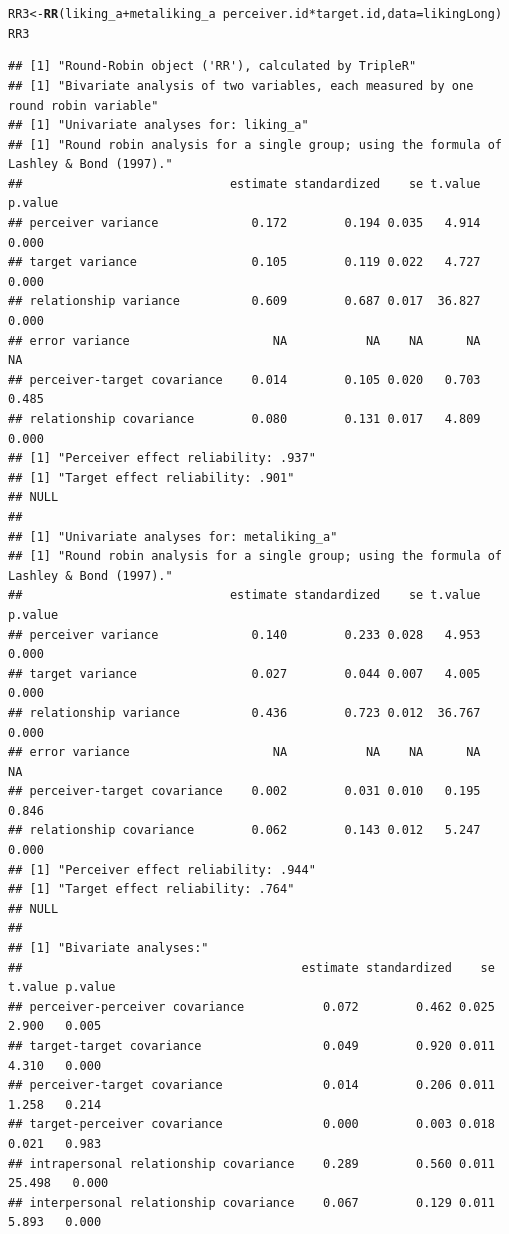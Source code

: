 \documentclass[a4paper]{article}\usepackage[]{graphicx}\usepackage[]{color}
\makeatletter
\newcommand{\hlopt}[1]{\textcolor[rgb]{0,0,0}{#1}}%
\newcommand{\hlstd}[1]{\textcolor[rgb]{0.345,0.345,0.345}{#1}}%
\newcommand{\hlkwb}[1]{\textcolor[rgb]{0.69,0.353,0.396}{#1}}%
\newcommand{\hlkwc}[1]{\textcolor[rgb]{0.333,0.667,0.333}{#1}}%
\newcommand{\hlkwd}[1]{\textcolor[rgb]{0.737,0.353,0.396}{\textbf{#1}}}%
\newenvironment{kframe}{%
 \def\at@end@of@kframe{}%
 \ifinner\ifhmode%
  \def\at@end@of@kframe{\end{minipage}}%
  \begin{minipage}{\columnwidth}%
 \fi\fi%
 \def\FrameCommand##1{\hskip\@totalleftmargin \hskip-\fboxsep
 \colorbox{shadecolor}{##1}\hskip-\fboxsep
     \hskip-\linewidth \hskip-\@totalleftmargin \hskip\columnwidth}%
 \MakeFramed {\advance\hsize-\width
   \@totalleftmargin\z@ \linewidth\hsize
   \@setminipage}}%
 {\par\unskip\endMakeFramed%
 \at@end@of@kframe}
\newenvironment{knitrout}{}{} %
\makeatother
\begin{document}
\begin{knitrout}\small
{}\color{fgcolor}\begin{kframe}
\begin{alltt}
\hlstd{RR3} \hlkwb{<-} \hlkwd{RR}\hlstd{(liking_a} \hlopt{+} \hlstd{metaliking_a} \hlopt{~} \hlstd{perceiver.id} \hlopt{*} \hlstd{target.id,} \hlkwc{data} \hlstd{= likingLong)}
\hlstd{RR3}
\end{alltt}
\begin{verbatim}
## [1] "Round-Robin object ('RR'), calculated by TripleR"
## [1] "Bivariate analysis of two variables, each measured by one round robin variable"
## [1] "Univariate analyses for: liking_a"
## [1] "Round robin analysis for a single group; using the formula of Lashley & Bond (1997)."
##                             estimate standardized    se t.value p.value
## perceiver variance             0.172        0.194 0.035   4.914   0.000
## target variance                0.105        0.119 0.022   4.727   0.000
## relationship variance          0.609        0.687 0.017  36.827   0.000
## error variance                    NA           NA    NA      NA      NA
## perceiver-target covariance    0.014        0.105 0.020   0.703   0.485
## relationship covariance        0.080        0.131 0.017   4.809   0.000
## [1] "Perceiver effect reliability: .937"
## [1] "Target effect reliability: .901"
## NULL
## 
## [1] "Univariate analyses for: metaliking_a"
## [1] "Round robin analysis for a single group; using the formula of Lashley & Bond (1997)."
##                             estimate standardized    se t.value p.value
## perceiver variance             0.140        0.233 0.028   4.953   0.000
## target variance                0.027        0.044 0.007   4.005   0.000
## relationship variance          0.436        0.723 0.012  36.767   0.000
## error variance                    NA           NA    NA      NA      NA
## perceiver-target covariance    0.002        0.031 0.010   0.195   0.846
## relationship covariance        0.062        0.143 0.012   5.247   0.000
## [1] "Perceiver effect reliability: .944"
## [1] "Target effect reliability: .764"
## NULL
## 
## [1] "Bivariate analyses:"
##                                       estimate standardized    se t.value p.value
## perceiver-perceiver covariance           0.072        0.462 0.025   2.900   0.005
## target-target covariance                 0.049        0.920 0.011   4.310   0.000
## perceiver-target covariance              0.014        0.206 0.011   1.258   0.214
## target-perceiver covariance              0.000        0.003 0.018   0.021   0.983
## intrapersonal relationship covariance    0.289        0.560 0.011  25.498   0.000
## interpersonal relationship covariance    0.067        0.129 0.011   5.893   0.000
\end{verbatim}
\end{kframe}
\end{knitrout}
\end{document}
